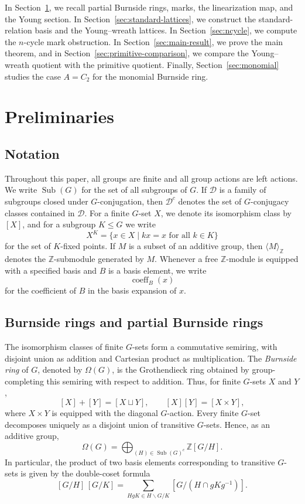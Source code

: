 \documentclass[a4paper,11pt]{article}
\numberwithin{equation}{section}
\newcommand{\Z}{\mathbb{Z}}
\newcommand{\coeff}{\operatorname{coeff}}
\begin{document}
In Section~\ref{sec:prelim}, we recall partial Burnside rings, marks, the linearization map, and the Young section. In Section~\ref{sec:standard-lattices}, we construct the standard-relation basis and the Young--wreath lattices. In Section~\ref{sec:ncycle}, we compute the $n$-cycle mark obstruction. In Section~\ref{sec:main-result}, we prove the main theorem, and in Section~\ref{sec:primitive-comparison}, we compare the Young--wreath quotient with the primitive quotient. Finally, Section~\ref{sec:monomial} studies the case $A=C_2$ for the monomial Burnside ring.

\section{Preliminaries}\label{sec:prelim}

\subsection{Notation}

Throughout this paper, all groups are finite and all group actions are left actions.
We write $\operatorname{Sub}(G)$ for the set of all subgroups of $G$.
If $\mathcal D$ is a family of subgroups closed under $G$-conjugation, then
$\mathcal D^{c}$ denotes the set of $G$-conjugacy classes contained in $\mathcal D$.
For a finite $G$-set $X$, we denote its isomorphism class by $[X]$, and for a subgroup
$K\le G$ we write
\[
  X^K=\{x\in X\mid kx=x\text{ for all }k\in K\}
\]
for the set of $K$-fixed points. If $M$ is a subset of an additive group, then
$\langle M\rangle_{\Z}$ denotes the $\Z$-submodule generated by $M$.
Whenever a free $\Z$-module is equipped with a specified basis and $B$ is a
basis element, we write
\[
  \coeff_B(x)
\]
for the coefficient of $B$ in the basis expansion of $x$.

\subsection{Burnside rings and partial Burnside rings}
\label{subsec:partial-burnside}

The isomorphism classes of finite $G$-sets form a commutative semiring, with disjoint
union as addition and Cartesian product as multiplication. The \emph{Burnside ring}
of $G$, denoted by $\Omega(G)$, is the Grothendieck ring obtained by group-completing
this semiring with respect to addition. Thus, for finite $G$-sets $X$ and $Y$,
\[
  [X]+[Y]=[X\sqcup Y],\qquad [X][Y]=[X\times Y],
\]
where $X\times Y$ is equipped with the diagonal $G$-action.
Every finite $G$-set decomposes uniquely as a disjoint union of transitive $G$-sets.
Hence, as an additive group,
\begin{equation}\label{eq:burnside-basis}
  \Omega(G)=
  \bigoplus_{(H)\in\operatorname{Sub}(G)^c}\Z[G/H].
\end{equation}
In particular, the product of two basis elements corresponding to transitive $G$-sets
is given by the double-coset formula
\begin{equation}\label{eq:burnside-product}
  [G/H]\,[G/K]
  =\sum_{HgK\in H\backslash G/K}
  [G/(H\cap gKg^{-1})].
\end{equation}
\end{document}
